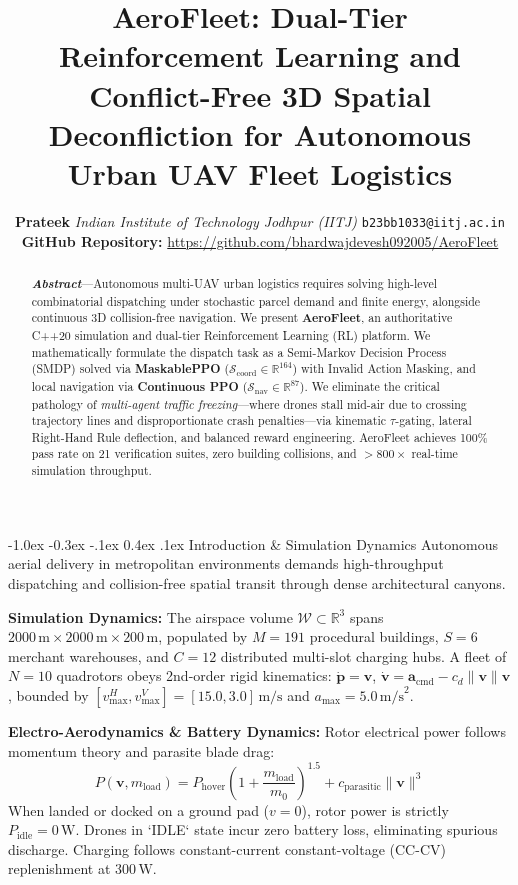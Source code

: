 \documentclass[10pt,twocolumn,letterpaper]{article}
\title{\vspace{-0.75cm}\Large\textbf{AeroFleet: Dual-Tier Reinforcement Learning and Conflict-Free 3D Spatial Deconfliction for Autonomous Urban UAV Fleet Logistics}\vspace{-0.3cm}}
\author{\small\textbf{Prateek} \quad \textit{Indian Institute of Technology Jodhpur (IITJ)} \quad \texttt{b23bb1033@iitj.ac.in} \\
\small\textbf{GitHub Repository:} \url{https://github.com/bhardwajdevesh092005/AeroFleet}\vspace{-0.35cm}}
\date{}
\makeatletter
\renewcommand{\section}{\@startsection{section}{1}{\z@}%
  {-1.0ex \@plus -0.3ex \@minus -.1ex}%
  {0.4ex \@plus .1ex}%
  {\normalfont\bfseries\normalsize}}
\makeatother
\begin{document}
\maketitle

\begin{abstract}
\small\textbf{\textit{Abstract}}---Autonomous multi-UAV urban logistics requires solving high-level combinatorial dispatching under stochastic parcel demand and finite energy, alongside continuous 3D collision-free navigation. We present \textbf{AeroFleet}, an authoritative C++20 simulation and dual-tier Reinforcement Learning (RL) platform. We mathematically formulate the dispatch task as a Semi-Markov Decision Process (SMDP) solved via \textbf{MaskablePPO} ($\mathcal{S}_{\text{coord}} \in \mathbb{R}^{164}$) with Invalid Action Masking, and local navigation via \textbf{Continuous PPO} ($\mathcal{S}_{\text{nav}} \in \mathbb{R}^{87}$). We eliminate the critical pathology of \emph{multi-agent traffic freezing}---where drones stall mid-air due to crossing trajectory lines and disproportionate crash penalties---via kinematic $\tau$-gating, lateral Right-Hand Rule deflection, and balanced reward engineering. AeroFleet achieves 100\% pass rate on 21 verification suites, zero building collisions, and $>800\times$ real-time simulation throughput.
\end{abstract}

\vspace{-0.15cm}
\section{Introduction \& Simulation Dynamics}
Autonomous aerial delivery in metropolitan environments demands high-throughput dispatching and collision-free spatial transit through dense architectural canyons. 

\textbf{Simulation Dynamics:} The airspace volume $\mathcal{W} \subset \mathbb{R}^3$ spans $2000\,\text{m} \times 2000\,\text{m} \times 200\,\text{m}$, populated by $M=191$ procedural buildings, $S=6$ merchant warehouses, and $C=12$ distributed multi-slot charging hubs. A fleet of $N=10$ quadrotors obeys 2nd-order rigid kinematics: $\dot{\mathbf{p}} = \mathbf{v}$, $\dot{\mathbf{v}} = \mathbf{a}_{\text{cmd}} - c_d \|\mathbf{v}\|\mathbf{v}$, bounded by $[v_{\max}^H, v_{\max}^V] = [15.0, 3.0]\,\text{m/s}$ and $a_{\max} = 5.0\,\text{m/s}^2$. 

\textbf{Electro-Aerodynamics \& Battery Dynamics:} Rotor electrical power follows momentum theory and parasite blade drag:
\begin{equation}
    P(\mathbf{v}, m_{\text{load}}) = P_{\text{hover}} \left(1 + \frac{m_{\text{load}}}{m_0}\right)^{1.5} + c_{\text{parasitic}} \|\mathbf{v}\|^3
\end{equation}
When landed or docked on a ground pad ($v=0$), rotor power is strictly $P_{\text{idle}} = 0\,\text{W}$. Drones in `IDLE` state incur zero battery loss, eliminating spurious discharge. Charging follows constant-current constant-voltage (CC-CV) replenishment at $300\,\text{W}$.
\end{document}
